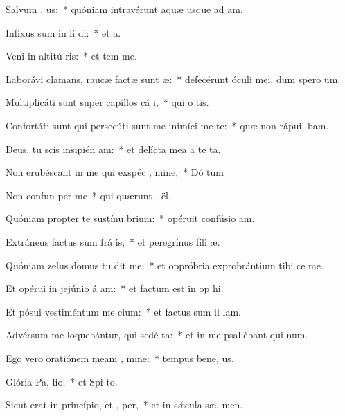 \item Salvum  , us:~* quóniam intravérunt aquæ usque ad  am.
\item Infíxus sum in li di:~* et   a.
\item Veni in altitú ris:~* et tem  me.
\item Laborávi clamans, raucæ factæ sunt  æ:~* defecérunt óculi mei, dum spero   um.
\item Multiplicáti sunt super capíllos cá i,~* qui o  tis.
\item Confortáti sunt qui persecúti sunt me inimíci me te:~* quæ non rápui,  bam.
\item Deus, tu scis insipién am:~* et delícta mea a te   ta.
\item Non erubéscant in me qui exspéc , mine,~* Dó tum
\item Non confun per me~* qui quærunt ,  ël.
\item Quóniam propter te sustínu brium:~* opéruit confúsio  am.
\item Extráneus factus sum frá is,~* et peregrínus fíli  æ.
\item Quóniam zelus domus tu dit me:~* et oppróbria exprobrántium tibi ce  me.
\item Et opérui in jejúnio á am:~* et factum est in op hi.
\item Et pósui vestiméntum me cium:~* et factus sum il  lam.
\item Advérsum me loquebántur, qui sedé  ta:~* et in me psallébant qui  num.
\item Ego vero oratiónem meam  , mine:~* tempus bene, us.
\item Glória Pa,  lio,~* et Spi to.
\item Sicut erat in princípio, et ,  per,~* et in sǽcula sæ. men.

